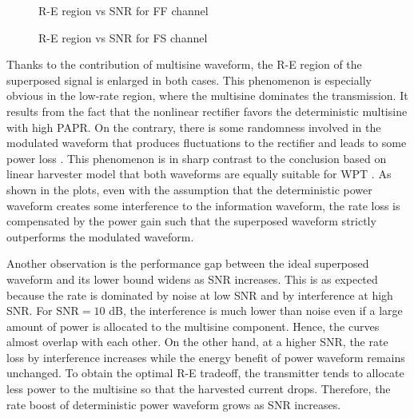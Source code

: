 \begin{figure}[ht]
  \centering
  \quad
  \caption{R-E region vs SNR for FF channel}\label{fig:siso-ff-snr}
\end{figure}

\begin{figure}[ht]
  \centering
  \quad
  \caption{R-E region vs SNR for FS channel}\label{fig:siso-fs-snr}
\end{figure}

Thanks to the contribution of multisine waveform, the R-E region of the superposed signal is enlarged in both cases. This phenomenon is especially obvious in the low-rate region, where the multisine dominates the transmission. It results from the fact that the nonlinear rectifier favors the deterministic multisine with high PAPR. On the contrary, there is some randomness involved in the modulated waveform that produces fluctuations to the rectifier and leads to some power loss \cite{Clerckx2018}. This phenomenon is in sharp contrast to the conclusion based on linear harvester model that both waveforms are equally suitable for WPT \cite{Xu2014a}. As shown in the plots, even with the assumption that the deterministic power waveform creates some interference to the information waveform, the rate loss is compensated by the power gain such that the superposed waveform strictly outperforms the modulated waveform.

Another observation is the performance gap between the ideal superposed waveform and its lower bound widens as SNR increases. This is as expected because the rate is dominated by noise at low SNR and by interference at high SNR. For ${\text{SNR}} = 10$ dB, the interference is much lower than noise even if a large amount of power is allocated to the multisine component. Hence, the curves almost overlap with each other. On the other hand, at a higher SNR, the rate loss by interference increases while the energy benefit of power waveform remains unchanged. To obtain the optimal R-E tradeoff, the transmitter tends to allocate less power to the multisine so that the harvested current drops. Therefore, the rate boost of deterministic power waveform grows as SNR increases.

